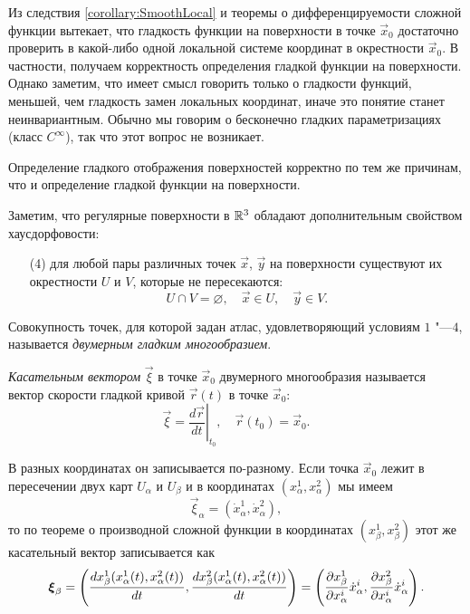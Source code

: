 Из следствия \ref{corollary:SmoothLocal} и теоремы о дифференцируемости сложной функции вытекает, что гладкость функции на поверхности в точке $\vec{x}_0$ достаточно проверить в какой-либо одной локальной системе координат в окрестности $\vec{x}_0$. В частности, получаем корректность определения гладкой функции на поверхности. Однако заметим, что имеет смысл говорить только о гладкости функций, меньшей, чем гладкость замен локальных координат, иначе это понятие станет неинвариантным. Обычно мы говорим о бесконечно гладких параметризациях (класс $C^\infty$), так что этот вопрос не возникает.

Определение гладкого отображения поверхностей корректно по тем же причинам, что и определение гладкой функции на поверхности.

Заметим, что регулярные поверхности в $\mathbb{R}^3$ обладают дополнительным свойством хаусдорфовости:
\begin{enumerate}[nolistsep, label=(\arabic*)]
	\item[(4)] для любой пары различных точек $\vec{x}$, $\vec{y}$ на поверхности существуют их окрестности $U$ и $V$, которые не пересекаются:
		\[
			U \cap V = \varnothing,\quad \vec{x} \in U,\quad \vec{y} \in V.
		\]
\end{enumerate}

\begin{definition}
	Совокупность точек, для которой задан атлас, удовлетворяющий условиям $1$ "---$4$, называется \textit{двумерным гладким многообразием}.
\end{definition}

\begin{definition}
	\textit{Касательным вектором} $\vec{\xi}$ в точке $\vec{x}_0$ двумерного многообразия называется вектор скорости гладкой кривой $\vec{r}(t)$ в точке $\vec{x}_0$:
	\[
		\vec{\xi} = \left.\frac{d\vec{r}}{dt}\right|_{t_0},\quad \vec{r}(t_0) = \vec{x}_0.
	\]
\end{definition}

В разных координатах он записывается по-разному. Если точка $\vec{x}_0$ лежит в пересечении двух карт $U_\alpha$ и $U_\beta$ и в координатах $(x_\alpha^1, x_\alpha^2)$ мы имеем
\[
	\vec{\xi}_\alpha = (\dot{x}^1_\alpha, \dot{x}^2_\alpha),
\]
то по теореме о производной сложной функции в координатах $(x_\beta^1, x_\beta^2)$ этот же касательный вектор записывается как
\[
	\boldsymbol{\xi}_\beta = \left(\frac{dx_\beta^1(x_\alpha^1(t), x_\alpha^2(t))}{dt}, \frac{dx_\beta^2(x_\alpha^1(t), x_\alpha^2(t))}{dt}\right) = \left(\frac{\partial x_\beta^1}{\partial x^i_\alpha}\dot{x}_\alpha^i, \frac{\partial x_\beta^2}{\partial x^i_\alpha}\dot{x}_\alpha^i\right).
\]

